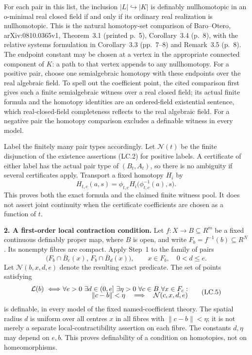For each pair in this list, the inclusion $|L|\hookrightarrow|K|$ is
definably nullhomotopic in an o-minimal real closed field if and only if
its ordinary real realization is nullhomotopic. This is the natural
homotopy-set comparison of Baro--Otero, arXiv:0810.0365v1,
Theorem~3.1 (printed p.~5), Corollary~3.4 (p.~8), with the relative
systems formulation in Corollary~3.3 (pp.~7--8) and Remark~3.5 (p.~8).
The endpoint constant may be chosen at a vertex in the appropriate
connected component of $K$: a path to that vertex appends to any
nullhomotopy. For a positive pair, choose one semialgebraic homotopy
with these endpoints over the real algebraic field. To spell out the
coefficient point, the cited comparison first gives such a finite
semialgebraic witness over a real closed field; its actual finite formula
and the homotopy identities are an ordered-field existential sentence,
which real-closed-field completeness reflects to the real algebraic
field. For a negative pair the homotopy comparison excludes a definable
witness in every model.

Label the finitely many pair types accordingly. Let $\mathcal N(t)$ be
the finite disjunction of the existence assertions (LC.2) for positive
labels. A certificate of either label has the actual pair type of
$(B_t,A_t)$, so there is no ambiguity if several certificates apply.
Transport a fixed homotopy $H_i$ by
\[
 H_{t,c}(a,s)=\phi_{t,c}
       H_i\bigl(\phi_{t,c}^{-1}(a),s\bigr).
 \tag{LC.3}
\]
This proves both the exact formula and the claimed finite witness pool.
It does not assert joint continuity when the certificate coefficients
are chosen as a function of $t$.

\textbf{2. A first-order local contraction condition.}
Let $f:X\to B\subseteq R^m$ be a fixed continuous definably proper map,
where $B$ is open, and write $F_b=f^{-1}(b)\subseteq R^N$. Its nonempty
fibres are compact. Apply Step~1 to the family of pairs
\[
 \bigl(F_b\cap\overline B_e(x),\,
       F_b\cap\overline B_d(x)\bigr),
 \qquad x\in F_b,\quad 0<d\le e.
 \tag{LC.4}
\]
Let $\mathcal N(b,x,d,e)$ denote the resulting exact predicate. The set
of points satisfying
\[
 \begin{split}
 \mathcal L(b)\ \Longleftrightarrow\
 &\forall e>0\ \exists d\in(0,e]\ \exists\eta>0\
   \forall c\in B\ \forall x\in F_c:\\[-2mm]
 &\hspace{15mm}
 \|c-b\|<\eta\quad\Longrightarrow\quad
       \mathcal N(c,x,d,e)
 \end{split}
 \tag{LC.5}
\]
is definable, in every model of the fixed named-coefficient theory.
The spatial radius $d$ is uniform over all centres $x$ in all fibres
with $\|c-b\|<\eta$; it is not merely a separate local-contractibility
assertion on each fibre. The constants $d,\eta$ may depend on $e,b$.
This proves definability of a condition on homotopies, not on
homeomorphisms.

